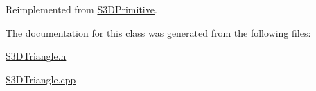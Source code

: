 Reimplemented from \hyperlink{class_s3_d_primitive_a1c8f036193987522bdfb6a49b9b74000}{S3DPrimitive}.



The documentation for this class was generated from the following files:\begin{DoxyCompactItemize}
\item 
\hyperlink{_s3_d_triangle_8h}{S3DTriangle.h}\item 
\hyperlink{_s3_d_triangle_8cpp}{S3DTriangle.cpp}\end{DoxyCompactItemize}

